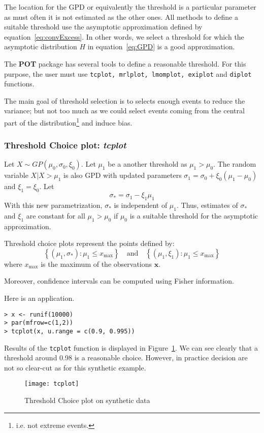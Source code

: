 \documentclass[11pt,a4paper]{article}
\numberwithin{equation}{section}
\begin{document}
The location for the GPD or equivalently the threshold is a particular
parameter as must often it is not estimated as the other ones. All
methods to define a suitable threshold use the asymptotic
approximation defined by equation~\eqref{eq:convExcess}. In other
words, we select a threshold for which the asymptotic distribution $H$
in equation~\eqref{eq:GPD} is a good approximation.

The \textbf{POT} package has several tools to define a reasonable
threshold. For this purpose, the user must use
\verb+tcplot, mrlplot, lmomplot, exiplot+ and \verb+diplot+ functions.

The main goal of threshold selection is to selects enough events to
reduce the variance; but not too much as we could select events coming
from the central part of the distribution\footnote{i.e. not extreme
  events.} and induce bias.

\subsubsection{Threshold Choice plot:  \emph{tcplot}}
\label{subsubsection:tcplot}

Let $X \sim GP(\mu_0, \sigma_0, \xi_0)$. Let $\mu_1$ be a another
threshold as $\mu_1 > \mu_0$. The random variable $X | X > \mu_1$ is
also GPD with updated parameters $\sigma_1 = \sigma_0 + \xi_0 ( \mu_1
- \mu_0)$ and $\xi_1 = \xi_0$.
Let
\begin{equation}
  \label{eq:reparamScale}
  \sigma_* = \sigma_1 - \xi_1 \mu_1
\end{equation}
With this new parametrization, $\sigma_*$ is independent of
$\mu_1$. Thus, estimates of $\sigma_*$ and $\xi_1$ are constant for
all $\mu_1 > \mu_0$ if $\mu_0$ is a suitable threshold for the
asymptotic approximation.

Threshold choice plots represent the points defined by:
\begin{equation}
  \label{eq:tcplot}
  \left\{\left(\mu_1, \sigma_*\right) : \mu_1 \leq x_\mathrm{max}
  \right\} \quad \text{and} \quad \left\{\left(\mu_1, \xi_1\right) :
    \mu_1 \leq x_\mathrm{max} \right\}
\end{equation}
where $x_\mathrm{max}$ is the maximum of the observations
$\mathbf{x}$.

Moreover, confidence intervals can be computed using Fisher
information. 

Here is an application.
\begin{verbatim}
> x <- runif(10000)
> par(mfrow=c(1,2))
> tcplot(x, u.range = c(0.9, 0.995))
\end{verbatim}
Results of the \verb+tcplot+ function is displayed in
Figure~\ref{fig:tcplot}. We can see clearly that a threshold around
0.98 is a reasonable choice. However, in practice decision are not so
clear-cut as for this synthetic example.
\begin{figure}
  \centering
  \texttt{[image: tcplot]}
  \caption{Threshold Choice plot on synthetic data}
  \label{fig:tcplot}
\end{figure}
\end{document}
